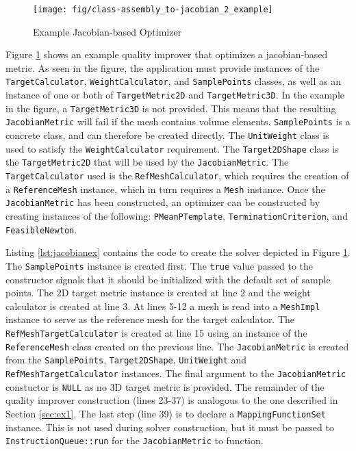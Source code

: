 \documentclass{article}
\begin{document}
\begin{figure}[p]
\begin{center}
\texttt{[image: fig/class-assembly\_to-jacobian\_2\_example]}
\caption{Example Jacobian-based Optimizer\label{fig:jacobianex}}
\end{center}
\end{figure}

Figure \ref{fig:jacobianex} shows an example quality improver that optimizes a jacobian-based metric.  As seen in the figure, the application must provide instances of the \texttt{TargetCalculator}, \texttt{WeightCalculator}, and \texttt{SamplePoints} classes, as well as an instance of one or both of \texttt{TargetMetric2D} and \texttt{TargetMetric3D}.  In the example in the figure, a \texttt{TargetMetric3D} is not provided.  This means that the resulting \texttt{JacobianMetric} will fail if the mesh contains volume elements.  \texttt{SamplePoints} is a concrete class, and can therefore be created directly.  The \texttt{UnitWeight} class is used to satisfy the \texttt{WeightCalculator} requirement.  The \texttt{Target2DShape} class is the \texttt{TargetMetric2D} that will be used by the \texttt{JacobianMetric}.  The \texttt{TargetCalculator} used is the \texttt{RefMeshCalculator}, which requires the creation of a \texttt{ReferenceMesh} instance, which in turn requires a \texttt{Mesh} instance.  Once the \texttt{JacobianMetric} has been constructed, an optimizer can be constructed by creating instances of the following: \texttt{PMeanPTemplate}, \texttt{TerminationCriterion}, and \texttt{FeasibleNewton}.

Listing \ref{lst:jacobianex} contains the code to create the solver depicted in Figure \ref{fig:jacobianex}.  The \texttt{SamplePoints} instance is created first.  The \texttt{true} value passed to the constructor signals that it should be initialized with the default set of sample points.  The 2D target metric instance is created at line 2 and the weight calculator is created at line 3.  At lines 5-12 a mesh is read into a \texttt{MeshImpl} instance to serve as the reference mesh for the target calculator.  The \texttt{RefMeshTargetCalculator} is created at line 15 using an instance of the \texttt{ReferenceMesh} class created on the previous line.  The \texttt{JacobianMetric} is created from the \texttt{SamplePoints}, \texttt{Target2DShape}, \texttt{UnitWeight} and \texttt{RefMeshTargetCalculator} instances.  The final argument to the \texttt{JacobianMetric} constuctor is \texttt{NULL} as no 3D target metric is provided.  The remainder of the quality improver construction (lines 23-37) is analogous to the one described in Section \ref{sec:ex1}.  The last step (line 39) is to declare a \texttt{MappingFunctionSet} instance.  This is not used during solver construction, but it must be passed to \texttt{InstructionQueue::run} for the \texttt{JacobianMetric} to function.
\end{document}
